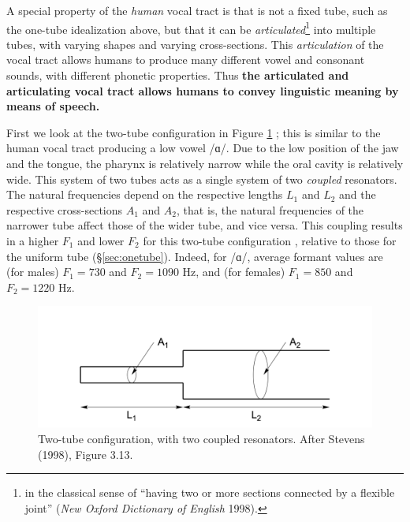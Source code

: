 \documentclass[
]{book}
\begin{document}
A special property of the \emph{human} vocal tract is that is not a fixed tube, such as the one-tube idealization above, but that it can be \emph{articulated}\footnote{in the classical sense of ``having two or more sections connected by a flexible joint'' (\emph{New Oxford Dictionary of English} 1998).} into multiple tubes, with varying shapes and varying cross-sections. This \emph{articulation} of the vocal tract allows humans to produce many different vowel and consonant sounds, with different phonetic properties. Thus \textbf{the articulated and articulating vocal tract allows humans to convey linguistic meaning by means of speech.}

First we look at the two-tube configuration in Figure \ref{fig:twotube} \citep[after][Fig.3.13, p.143]{Stevens_1998}; this is similar to the human vocal tract producing a low vowel /ɑ/. Due to the low position of the jaw and the tongue, the pharynx is relatively narrow while the oral cavity is relatively wide. This system of two tubes acts as a single system of two \emph{coupled} resonators. The natural frequencies depend on the respective lengths \(L_1\) and \(L_2\) and the respective cross-sections \(A_1\) and \(A_2\), that is, the natural frequencies of the narrower tube affect those of the wider tube, and vice versa. This coupling results in a higher \(F_1\) and lower \(F_2\) for this two-tube configuration \citep[Fig.3.14]{Stevens_1998}, relative to those for the uniform tube (§\ref{sec:onetube}). Indeed, for /ɑ/, average formant values are (for males) \(F_1=730\) and \(F_2=1090\) Hz, and (for females) \(F_1=850\) and \(F_2=1220\) Hz.

\begin{figure}

{\centering \includegraphics{figures/twotube} 

}

\caption{Two-tube configuration, with two coupled resonators. After Stevens (1998), Figure 3.13.}\label{fig:twotube}
\end{figure}
\end{document}
